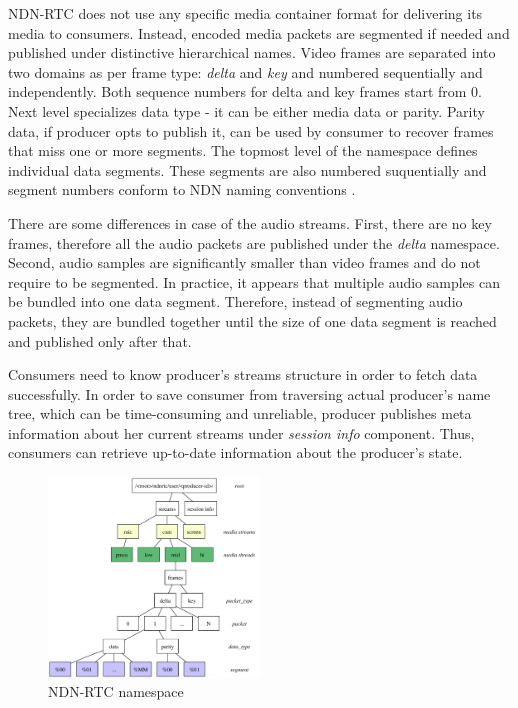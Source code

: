 \documentclass[10pt]{icn/sig-alternate-10pt} %
\newcommand{\ndnrtcName}{NDN-RTC} %
\begin{document}
\ndnrtcName{} does not use any specific media container format for delivering its media to consumers. Instead, encoded media packets are segmented if needed and published under distinctive hierarchical names. Video frames are separated into two domains as per frame type: \textit{delta} and \textit{key} and numbered sequentially and independently. Both sequence numbers for delta and key frames start from 0. Next level specializes data type - it can be either media data or parity. Parity data, if producer opts to publish it, can be used by consumer to recover frames that miss one or more segments. The topmost level of the namespace defines individual data segments. These segments are also numbered suquentially and segment numbers conform to NDN naming conventions \cite{ndn_naming}.

There are some differences in case of the audio streams. First, there are no key frames, therefore all the audio packets are published under the \textit{delta} namespace. Second, audio samples are significantly smaller than video frames and do not require to be segmented. In practice, it appears that multiple audio samples can be bundled into one data segment. Therefore, instead of segmenting audio packets, they are bundled together until the size of one data segment is reached and published only after that.

Consumers need to know producer's streams structure in order to fetch data successfully. In order to save consumer from traversing actual producer's name tree, which can be time-consuming and unreliable, producer publishes meta information about her current streams under \textit{session info} component. Thus, consumers can retrieve up-to-date information about the producer's state.

\begin{figure}[t!]
\centering
\includegraphics[width=0.5\textwidth]{namespace}
\caption{\ndnrtcName{} namespace}
\label{fig:namespace}
\end{figure}
\end{document}
